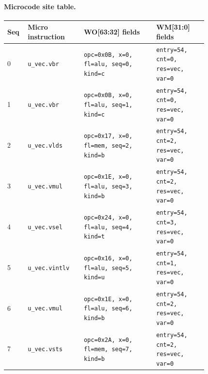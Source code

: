 \paragraph{Microcode site table.}
{\scriptsize
\begin{longtable}{@{}R{0.055\linewidth}L{0.23\linewidth}L{0.31\linewidth}L{0.22\linewidth}@{}}
\toprule
Seq & Micro instruction & WO[63:32] fields & WM[31:0] fields \\
 & \texttt{u\_vec.vbr} & \texttt{opc=0x0B, x=0, fl=alu, seq=0, kind=c} & \texttt{entry=54, cnt=0, res=vec, var=0} \\
1 & \texttt{u\_vec.vbr} & \texttt{opc=0x0B, x=0, fl=alu, seq=1, kind=c} & \texttt{entry=54, cnt=0, res=vec, var=0} \\
2 & \texttt{u\_vec.vlds} & \texttt{opc=0x17, x=0, fl=mem, seq=2, kind=b} & \texttt{entry=54, cnt=2, res=vec, var=0} \\
3 & \texttt{u\_vec.vmul} & \texttt{opc=0x1E, x=0, fl=alu, seq=3, kind=b} & \texttt{entry=54, cnt=2, res=vec, var=0} \\
4 & \texttt{u\_vec.vsel} & \texttt{opc=0x24, x=0, fl=alu, seq=4, kind=t} & \texttt{entry=54, cnt=3, res=vec, var=0} \\
5 & \texttt{u\_vec.vintlv} & \texttt{opc=0x16, x=0, fl=alu, seq=5, kind=u} & \texttt{entry=54, cnt=1, res=vec, var=0} \\
6 & \texttt{u\_vec.vmul} & \texttt{opc=0x1E, x=0, fl=alu, seq=6, kind=b} & \texttt{entry=54, cnt=2, res=vec, var=0} \\
7 & \texttt{u\_vec.vsts} & \texttt{opc=0x2A, x=0, fl=mem, seq=7, kind=b} & \texttt{entry=54, cnt=2, res=vec, var=0} \\
\bottomrule
\end{longtable}
}
